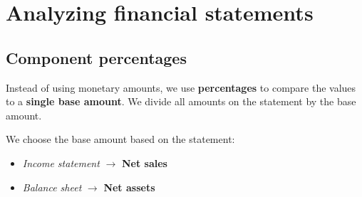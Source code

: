 \section{Analyzing financial statements}
\label{sec:analyze}

\subsection{Component percentages}
\label{sec:component-percentages}

Instead of using monetary amounts, we use \textbf{percentages} to compare the values to a \textbf{single base amount}. We divide all amounts on the statement by the base amount.

We choose the base amount based on the statement:
\begin{itemize}
    \item \textit{Income statement} $\rightarrow$ \textbf{Net sales}
    \item \textit{Balance sheet} $\rightarrow$ \textbf{Net assets}
\end{itemize}

